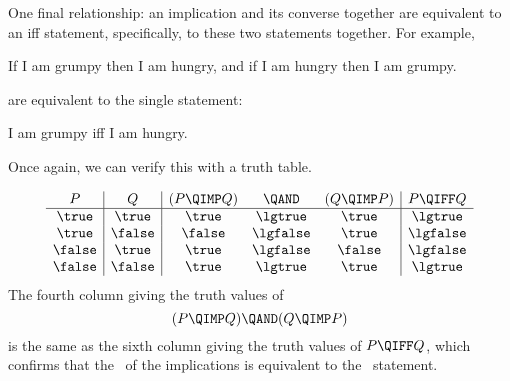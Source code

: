 One final relationship: an implication and its converse together are
equivalent to an iff statement, specifically, to these two statements
together.  For example,
%
\begin{center}
If I am grumpy then I am hungry, and if I am hungry then I am grumpy.
\end{center}
%
are equivalent to the single statement:
%
\begin{center}
I am grumpy iff I am hungry.
\end{center}
%
Once again, we can verify this with a truth table.  

\iffalse
We begin with a table with just the truth values of $P$ and $Q$:
%
\[
\begin{array}{c|c|ccc|c}
P & Q & (P \QIMP Q) &\QAND & (Q  \QIMP  P) & P \QIFF Q \\
\hline
\true  &  \true  &&&&\\
\true  &  \false &&&&\\
\false &  \true  &&&&\\
\false &  \false &&&&
\end{array}
\]
These truth values are enough to fill in three more columns:
\[
\begin{array}{c|c|ccc|c}
P & Q & (P \QIMP Q) &\QAND & (Q  \QIMP  P) & P \QIFF Q \\
\hline
\true  &  \true  &\true  &&\true & \lgtrue \\
\true  &  \false &\false &&\true & \lgfalse\\
\false &  \true  &\true  &&\false& \lgfalse\\
\false &  \false &\true  &&\true & \lgtrue 
\end{array}
\]
Finally, now using the first two of the filled in columns, we can fill in
the fourth column:
\fi

\[
\begin{array}{c|c|ccc|c}
P & Q & (P \QIMP Q) &\QAND & (Q  \QIMP  P) & P \QIFF Q \\
\hline
\true  &  \true  &\true  &\lgtrue &\true & \lgtrue \\
\true  &  \false &\false &\lgfalse&\true & \lgfalse\\
\false &  \true  &\true  &\lgfalse&\false& \lgfalse\\
\false &  \false &\true  &\lgtrue &\true & \lgtrue
\end{array}
\]
The fourth column giving the truth values of 
\[
(P \QIMP Q) \QAND (Q \QIMP P)
\]
is the same as the sixth column giving the truth values of $P \QIFF
Q$, which confirms that the \QAND\ of the implications is equivalent
to the \QIFF\ statement.

